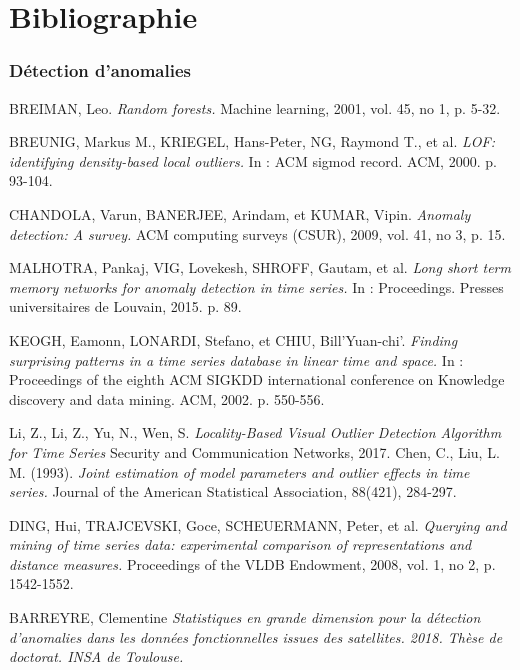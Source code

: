 \chapter{Bibliographie}

\begin{thebibliography}{1}
\subsection*{Détection d'anomalies}
BREIMAN, Leo. 
\emph{Random forests.}
Machine learning, 2001, vol. 45, no 1, p. 5-32.

	 BREUNIG, Markus M., KRIEGEL, Hans-Peter, NG, Raymond T., et al. 
	 \emph{LOF: identifying density-based local outliers.} 
	 In : ACM sigmod record. ACM, 2000. p. 93-104.
	  
	  CHANDOLA, Varun, BANERJEE, Arindam, et KUMAR, Vipin. 
	  \emph{Anomaly detection: A survey.}
	   ACM computing surveys (CSUR), 2009, vol. 41, no 3, p. 15.
	   
	MALHOTRA, Pankaj, VIG, Lovekesh, SHROFF, Gautam, et al.
	\emph{Long short term memory networks for anomaly detection in time series.} 
	In : Proceedings. Presses universitaires de Louvain, 2015. p. 89.
	   
   KEOGH, Eamonn, LONARDI, Stefano, et CHIU, Bill'Yuan-chi'. 
   \emph{Finding surprising patterns in a time series database in linear time and space.} In : Proceedings of the eighth ACM SIGKDD international conference on Knowledge discovery and data mining. ACM, 2002. p. 550-556.
	   
Li, Z., Li, Z., Yu, N., Wen, S. 	   
	   \emph{Locality-Based Visual Outlier Detection Algorithm for Time Series}
	   Security and Communication Networks, 2017.  
	Chen, C., Liu, L. M. (1993).
\emph{Joint estimation of model parameters and outlier effects in time series.}
Journal of the American Statistical Association, 88(421), 284-297.	   

DING, Hui, TRAJCEVSKI, Goce, SCHEUERMANN, Peter, et al. 
\emph{Querying and mining of time series data: experimental comparison of representations and distance measures.}
 Proceedings of the VLDB Endowment, 2008, vol. 1, no 2, p. 1542-1552.

BARREYRE, Clementine
\emph{Statistiques en grande dimension pour la détection d'anomalies dans les données fonctionnelles issues des satellites. 2018. Thèse de doctorat. INSA de Toulouse.}


\end{thebibliography}
